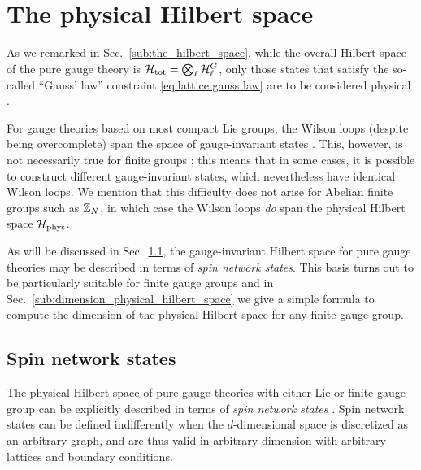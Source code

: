 \newcommand{\InvSpace}[4]{\mathrm{Inv}\bqty{ V_{j_{#1}}^{\ast} \otimes V_{j_{#2}}^{\ast} \otimes V_{j_{#3}} \otimes V_{j_{#4}}}}
\newcommand{\jm}[1]{\ket{j_{#1} m_{#1}}}
\newcommand{\jn}[1]{\ket{j_{#1} n_{#1}}}
\newcommand{\jmn}[1]{\ket{j_{#1} m_{#1} n_{#1}}}

\section{The physical Hilbert space}\label{sec:physical Hilbert space}

As we remarked in Sec.~\ref{sub:the_hilbert_space}, while the overall Hilbert space of the pure gauge theory is $\mathcal{H}_{\text{tot}} = \bigotimes_{\ell} \mathcal{H}^{G}_{\ell}$, only those states that satisfy the so-called ``Gauss' law'' constraint \eqref{eq:lattice gauss law} are to be considered physical \cite{kogut1975hamiltonian, milstead2018qyangmills, tong2018gauge}.

For gauge theories based on most compact Lie groups, the Wilson loops (despite being overcomplete) span the space of gauge-invariant states \cite{sengupta1994gaugeinvariant, durhuus1980gaugeinvariant}.
This, however, is not necessarily true for finite groups \cite{sengupta1994gaugeinvariant, cui2020kitaev}; this means that in some cases, it is possible to construct different gauge-invariant states, which nevertheless have identical Wilson loops.
We mention that this difficulty does not arise for Abelian finite groups such as $\mathbb{Z}_N$, in which case the Wilson loops \emph{do} span the physical Hilbert space $\mathcal{H}_{\text{phys}}$.

As will be discussed in Sec.~\ref{sec:spin networks pure gauge}, the gauge-invariant Hilbert space for pure gauge theories may be described in terms of \emph{spin network states}. This basis turns out to be particularly suitable for finite gauge groups and in Sec.~\ref{sub:dimension_physical_hilbert_space} we give a simple formula to compute the dimension of the physical Hilbert space for any finite gauge group.

\subsection{Spin network states}\label{sec:spin networks pure gauge}

The physical Hilbert space of pure gauge theories with either Lie or finite gauge group can be explicitly described in terms of \emph{spin network states} \cite{baez1996spinnetworks, burgio2000physical}.
Spin network states can be defined indifferently when the $d$-dimensional space is discretized as an arbitrary graph, and are thus valid in arbitrary dimension with arbitrary lattices and boundary conditions.

